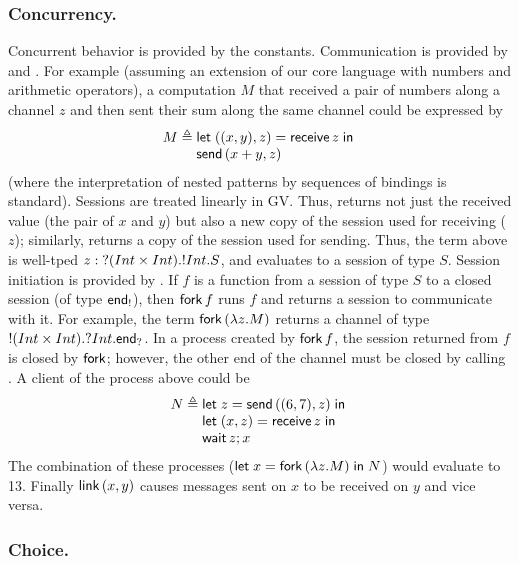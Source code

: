 \documentclass[oribibl,orivec,envcountsame]{llncs}
\begin{document}
\subsubsection{Concurrency.}

Concurrent behavior is provided by the constants.  Communication is provided by  and
.  For example (assuming an extension of our core language with numbers and
arithmetic operators), a computation $M$ that received a pair of numbers along a channel $z$ and then
sent their sum along the same channel could be expressed by
%
\[
M \defeq
  \bl
    \gvlet{((x, y), z)}{\gvreceive{z}}{} \\
    \gvsend{(x + y,z)}
  \el
\]
%
(where the interpretation of nested patterns by sequences of bindings is standard).  Sessions are
treated linearly in GV.  Thus,  returns not just the received value (the pair of
$x$ and $y$) but also a new copy of the session used for receiving ($z$); similarly, 
returns a copy of the session used for sending.  Thus, the term above is well-tped $z : {?(Int
  \times Int).{!Int.S}}$, and evaluates to a session of type $S$. Session initiation is
provided by .  If $f$ is a function from a session of type $S$ to a closed session (of
type $\mathsf{end}_!$), then $\mathsf{fork} \, f$ runs $f$ and returns a session to communicate with
it.  For example, the term $\mathsf{fork} \, (\lambda z. M)$ returns a channel of type
${!(Int \times Int).{?Int.\mathsf{end}_?}}$.  In a process created by $\mathsf{fork} \, f$,
the session returned from $f$ is closed by $\mathsf{fork}$; however, the other end of the channel
must be closed by calling .  A client of the process above could be
%
\[N \defeq
  \bl
  \gvlet{z}{\gvsend{((6,7),z)}}{} \\
  \gvlet{(x,z)}{\gvreceive{z}}{} \\
  \gvletunit{\gvconst{wait}\app z}{x}
\el\]
%
The combination of these processes ($\mathsf{let}\;x = \mathsf{fork}\,(\lambda z.M)\;\mathsf{in}\;N$) would evaluate
to 13.  Finally $\mathsf{link} \, (x, y)$ causes messages sent on $x$ to be received on $y$ and
vice versa.

\subsubsection{Choice.}
\end{document}
